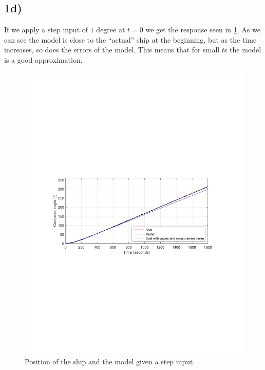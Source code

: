 \subsection{1d)}

If we apply a step input of $1$ degree at $t=0$ we get the response seen in \cref{fig:step_1}. As we can see the model is close to the ``actual'' ship at the beginning, but as the time increases, so does the errors of the model. This means that for small $t$s the model is a good approximation.

\begin{figure}
	\centering
	\includegraphics[width=\textwidth]{images/oppg1/step1_with_model_trafu.pdf}
	\caption{Position of the ship and the model given a step input}
	\label{fig:step_1}
\end{figure}
